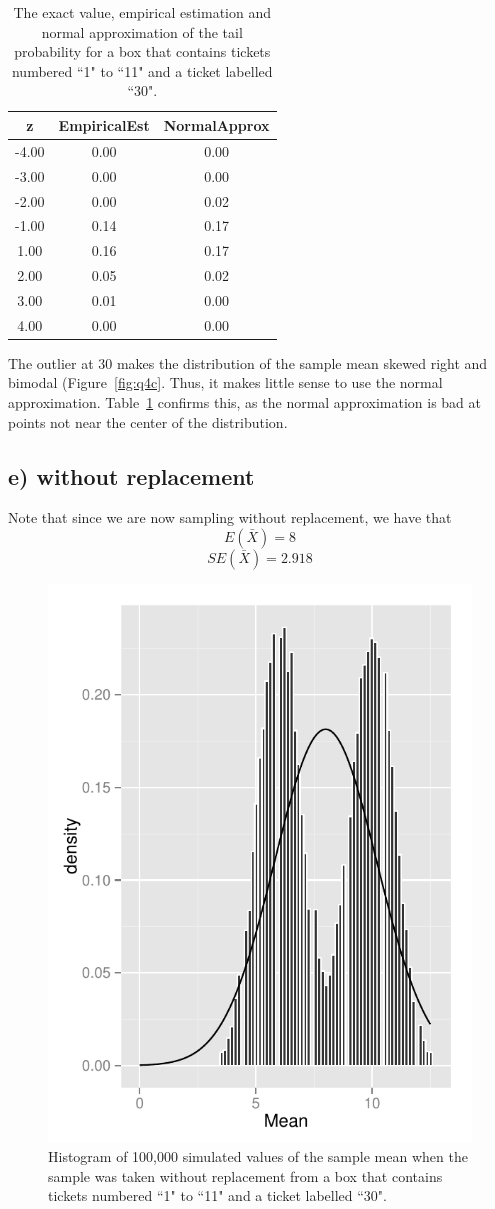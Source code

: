 \documentclass[11pt]{article}
\begin{document}
\begin{table}[H]
\centering
\begin{tabular}{|c|cc|}
  \hline
z & EmpiricalEst & NormalApprox \\ 
  \hline
-4.00 & 0.00 & 0.00 \\ 
  -3.00 & 0.00 & 0.00 \\ 
  -2.00 & 0.00 & 0.02 \\ 
  -1.00 & 0.14 & 0.17 \\ 
  1.00 & 0.16 & 0.17 \\ 
  2.00 & 0.05 & 0.02 \\ 
  3.00 & 0.01 & 0.00 \\ 
  4.00 & 0.00 & 0.00 \\ 
   \hline
\end{tabular}
\caption{The exact value, empirical estimation and normal approximation of the tail probability for a box that contains tickets numbered ``1" to ``11" and a ticket labelled ``30".} \label{tab:q4c}
\end{table}

\noindent The outlier at $30$ makes the distribution of the sample mean skewed right and bimodal (Figure~\ref{fig:q4c}.  Thus, it makes little sense to use the normal approximation.  Table~\ref{tab:q4c} confirms this, as the normal approximation is bad at points not near the center of the distribution.



\subsection*{e) without replacement}


\noindent Note that since we are now sampling without replacement, we have that
$$E(\bar{X})= 8$$ 
$$SE(\bar{X}) = 2.918$$


\begin{figure}[H]
\centering
\includegraphics[width = .5\textwidth]{histogram_4e-1.pdf}
\caption{Histogram of 100,000 simulated values of the sample mean when the sample was taken without replacement from a box that contains tickets numbered ``1" to ``11" and a ticket labelled ``30".}\label{fig:q4e}
\end{figure}
\end{document}
